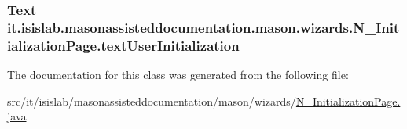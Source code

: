 \hypertarget{classit_1_1isislab_1_1masonassisteddocumentation_1_1mason_1_1wizards_1_1_n___initialization_page_a801ef706c684a82e18b90c3bf95d84f7}{
\subsubsection[{text\-User\-Initialization}]{\setlength{\rightskip}{0pt plus 5cm}Text it.\-isislab.\-masonassisteddocumentation.\-mason.\-wizards.\-N\-\_\-\-Initialization\-Page.\-text\-User\-Initialization\hspace{0.3cm}{\ttfamily [private]}}}\label{classit_1_1isislab_1_1masonassisteddocumentation_1_1mason_1_1wizards_1_1_n___initialization_page_a801ef706c684a82e18b90c3bf95d84f7}


The documentation for this class was generated from the following file\-:\begin{DoxyCompactItemize}
\item 
src/it/isislab/masonassisteddocumentation/mason/wizards/\hyperlink{_n___initialization_page_8java}{N\-\_\-\-Initialization\-Page.\-java}\end{DoxyCompactItemize}
